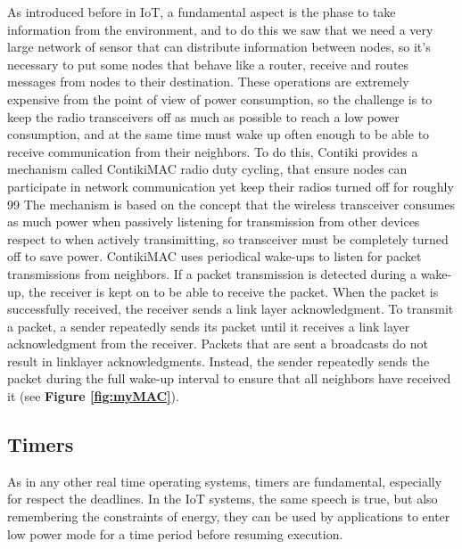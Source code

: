 \documentclass[a4paper,10pt]{article}
\begin{document}
\begin{multicols}{2}
As introduced before in IoT, a fundamental aspect is the phase to take information from the environment, and to do this we saw that we need a very large network of sensor that can distribute information between nodes, so it's necessary to put some nodes that behave like a router, receive and routes messages from nodes to their destination.
These operations are extremely expensive from the point of view of power consumption, so the challenge is to keep the radio transceivers off as much as possible to reach a low power consumption, and at the same time must wake up often enough to be able to receive communication from their neighbors.
To do this, Contiki provides a mechanism called ContikiMAC radio duty cycling, that ensure nodes can participate
in network communication yet keep their radios turned off for roughly 99%
The mechanism is based on the concept that the wireless transceiver consumes as much power when passively listening for transmission from other devices respect to when actively transimitting, so transceiver must be completely turned off to save power.
ContikiMAC uses periodical wake-ups to listen for packet transmissions from neighbors. If a packet transmission is detected during a wake-up, the receiver is kept on to be able to receive the packet. When the packet is successfully received, the receiver sends a link layer acknowledgment. To transmit a packet, a sender repeatedly sends its packet until it receives a link layer acknowledgment from the receiver. Packets that are sent a broadcasts do not result in linklayer acknowledgments. Instead, the sender repeatedly sends the packet during the full wake-up interval to ensure that all neighbors have received it (see {\bf Figure \ref{fig:myMAC}}).


\subsection{Timers}

As in any other real time operating systems, timers are fundamental, especially for respect the deadlines. In the IoT systems, the same speech is true, but also remembering the constraints of energy, they can be used by applications to enter low power mode for a time period before resuming execution.



\end{multicols}
\end{document}
